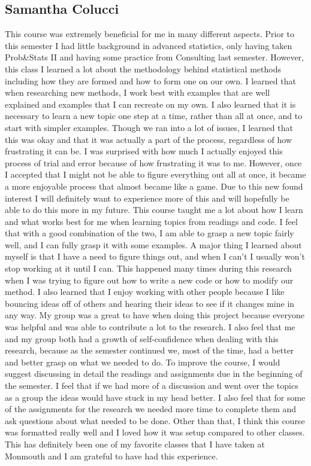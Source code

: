 \documentclass[12pt, letterpaper]{article}
\begin{document}
\subsection{Samantha Colucci}
This course was extremely beneficial for me in many different aspects. Prior to this semester I had little background in advanced statistics, only having taken Prob&Stats II and having some practice from Consulting last semester. However, this class I learned a lot about the methodology behind statistical methods including how they are formed and how to form one on our own. I learned that when researching new methods, I work best with examples that are well explained and examples that I can recreate on my own. I also learned that it is necessary to learn a new topic one step at a time, rather than all at once, and to start with simpler examples. Though we ran into a lot of issues, I learned that this was okay and that it was actually a part of the process, regardless of how frustrating it can be. I was surprised with how much I actually enjoyed this process of trial and error because of how frustrating it was to me. However, once I accepted that I might not be able to figure everything out all at once, it became a more enjoyable process that almost became like a game. Due to this new found interest I will definitely want to experience more of this and will hopefully be able to do this more in my future. This course taught me a lot about how I learn and what works best for me when learning topics from readings and code. I feel that with a good combination of the two, I am able to grasp a new topic fairly well, and I can fully grasp it with some examples. A major thing I learned about myself is that I have a need to figure things out, and when I can’t I usually won’t stop working at it until I can. This happened many times during this research when I was trying to figure out how to write a new code or how to modify our method. I also learned that I enjoy working with other people because I like bouncing ideas off of others and hearing their ideas to see if it changes mine in any way. My group was a great to have when doing this project because everyone was helpful and was able to contribute a lot to the research. I also feel that me and my group both had a growth of self-confidence when dealing with this research, because as the semester continued we, most of the time, had a better and better grasp on what we needed to do. To improve the course, I would suggest discussing in detail the readings and assignments due in the beginning of the semester. I feel that if we had more of a discussion and went over the topics as a group the ideas would have stuck in my head better. I also feel that for some of the assignments for the research we needed more time to complete them and ask questions about what needed to be done. Other than that, I think this course was formatted really well and I loved how it was setup compared to other classes. This has definitely been one of my favorite classes that I have taken at Monmouth and I am grateful to have had this experience.
\end{document}
